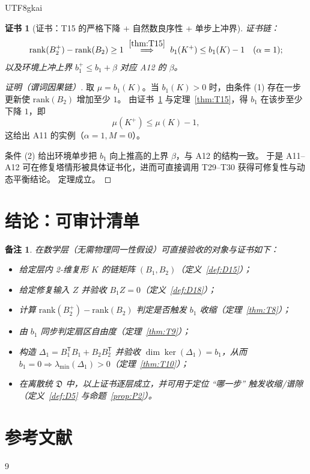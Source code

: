 \documentclass[12pt]{article}
\newtheorem{remark}{备注}[section]
\newtheorem{Certificate}{证书}[section]
\begin{document}
\begin{CJK*}{UTF8}{gkai}
\begin{Certificate}[证书：T15 的严格下降 + 自然数良序性 + 单步上冲界]
\label{cert:T34}
证书链：
\[
\mathrm{rank}(B_2^+)-\mathrm{rank}(B_2)\ge 1
\ \overset{\ref{thm:T15}}{\Longrightarrow}\
b_1(K^+)\le b_1(K)-1
\quad(\alpha=1);
\]
以及环境上冲上界 $b_1^{+}\le b_1+\beta$ 对应 A12 的 $\beta$。
\end{Certificate}

\begin{proof}[证明（谓词因果链）]
取 $\mu=b_1(K)$。当 $b_1(K)>0$ 时，由条件 (1) 存在一步更新使 $\mathrm{rank}(B_2)$ 增加至少 $1$。
由证书~\ref{cert:T34} 与定理~\ref{thm:T15}，得 $b_1$ 在该步至少下降 $1$，即
\[
\mu(K^+)\le \mu(K)-1,
\]
这给出 A11 的实例（$\alpha=1,M=0$）。

条件 (2) 给出环境单步把 $b_1$ 向上推高的上界 $\beta$，与 A12 的结构一致。
于是 A11--A12 可在修复塔情形被具体证书化，进而可直接调用 T29--T30 获得可修复性与动态平衡结论。
定理成立。
\end{proof}

\clearpage
\section{结论：可审计清单}

\begin{remark}
在数学层（无需物理同一性假设）可直接验收的对象与证书如下：
\begin{itemize}
\item 给定层内 2-维复形 $K$ 的链矩阵 $(B_1,B_2)$（定义~\ref{def:D15}）；
\item 给定修复输入 $Z$ 并验收 $B_1Z=0$（定义~\ref{def:D18}）；
\item 计算 $\mathrm{rank}(B_2^+)-\mathrm{rank}(B_2)$ 判定是否触发 $b_1$ 收缩（定理~\ref{thm:T8}）；
\item 由 $b_1$ 同步判定扇区自由度（定理~\ref{thm:T9}）；
\item 构造 $\Delta_1=B_1^{\mathsf T}B_1+B_2B_2^{\mathsf T}$ 并验收 $\dim\ker(\Delta_1)=b_1$，从而 $b_1=0\Rightarrow
  \lambda_{\min}(\Delta_1)>0$（定理~\ref{thm:T10}）；
\item 在离散统 $\mathfrak D$ 中，以上证书逐层成立，并可用于定位 ``哪一步'' 触发收缩/谱隙（定义~\ref{def:D5} 与命题~\ref{prop:P2}）。
\end{itemize}
\end{remark}

\section*{参考文献}
\begin{thebibliography}{9}
\end{thebibliography}

\end{CJK*}
\end{document}
